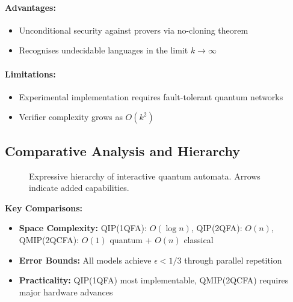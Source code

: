 \paragraph{Advantages:}
\begin{itemize}
    \item Unconditional security against provers via no-cloning theorem
    \item Recognises undecidable languages in the limit $k \rightarrow \infty$
\end{itemize}

\paragraph{Limitations:}
\begin{itemize}
    \item Experimental implementation requires fault-tolerant quantum networks
    \item Verifier complexity grows as $O(k^2)$
\end{itemize}

\subsection*{Comparative Analysis and Hierarchy}
\begin{figure}[h]
\centering
{}

\caption{Expressive hierarchy of interactive quantum automata. Arrows indicate added capabilities.}
\label{fig:interactive-hierarchy}
\end{figure}

\textbf{Key Comparisons:}
\begin{itemize}
    \item \textbf{Space Complexity:} QIP(1QFA): $O(\log n)$, QIP(2QFA): $O(n)$, QMIP(2QCFA): $O(1)$ quantum + $O(n)$ classical
    \item \textbf{Error Bounds:} All models achieve $\epsilon < 1/3$ through parallel repetition
    \item \textbf{Practicality:} QIP(1QFA) most implementable, QMIP(2QCFA) requires major hardware advances
\end{itemize}